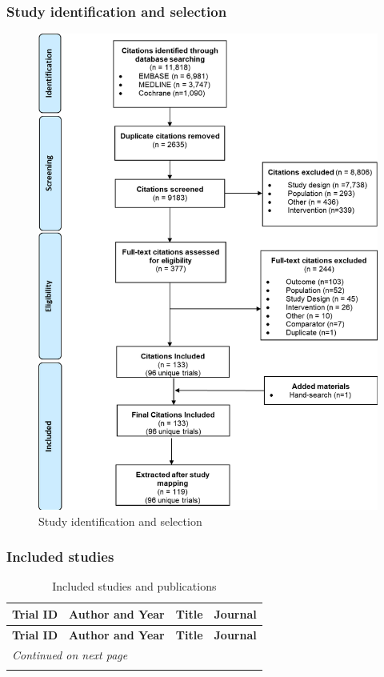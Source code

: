 \documentclass[11pt,final,fleqn]{article}
\theoremstyle{plain}
\begin{document}
\begin{appendices}
\subsubsection{Study identification and selection}
\begin{figure}[H]
\centering
\includegraphics{study-selection.png}
\vspace*{10mm}
\caption{Study identification and selection}\label{fig:study-identification}
\end{figure}

\subsubsection{Included studies}




\begin{landscape}
\scriptsize
\begin{longtable}{p{2cm}p{2cm}p{10cm}p{4cm}}
\caption{Included studies and publications} 
\label{tbl:included studies} \\
\hline
\textbf{Trial ID}&\textbf{Author and Year}&\textbf{Title}&\textbf{Journal} \\
\hline
\endfirsthead
\hline
\textbf{Trial ID}&\textbf{Author and Year}&\textbf{Title}&\textbf{Journal} \\
\hline
\endhead
\hline 
\multicolumn{7}{l}{\emph{Continued on next page}} \\
\endfoot
\endlastfoot


\end{longtable}
\end{landscape}
\end{appendices}
\end{document}
